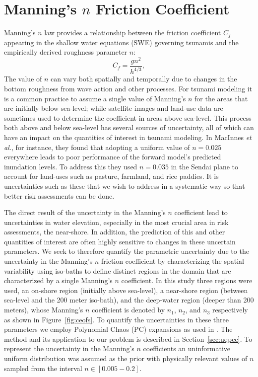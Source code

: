 \section{Manning’s $n$ Friction Coefficient} \label{sec:manning}

Manning's $n$ law provides a relationship between the friction coefficient
$C_f$ appearing in the shallow water equations (SWE) governing tsunamis and 
the empirically derived roughness parameter $n$:
\begin{equation}
    C_f = \frac{g n^2}{h^{4/3}},
\label{eq:coef}
\end{equation}
The value of $n$ can vary both spatially and temporally due to changes in the
bottom roughness from wave action and other processes.  For tsunami modeling it
is a common practice to assume a single value of Manning's $n$ for the areas
that are initially below sea-level; while satellite images and 
land-use data are sometimes used to determine the coefficient in areas above sea-level.  This
process both above and below sea-level has several sources of uncertainty, all
of which can have an impact on the quantities of interest in tsunami modeling.   
In MacInnes \emph{et al.}, for instance, they found that adopting a uniform value 
of $n = 0.025$ everywhere leads to poor performance of the forward model's predicted 
inundation levels.  To address this they used $n = 0.035$ in the Sendai plane to 
account for land-uses such as pasture, farmland, and rice paddies.  It is 
uncertainties such as these that we wish to address in a systematic way so that
better risk assessments can be done.

The direct result of the uncertainty in the Manning's $n$ coefficient lead to
uncertainties in water elevation,
especially in the most crucial area in risk assessments, the near-shore. In 
addition,  the prediction of this and other quantities of interest are often highly 
sensitive to changes in these uncertain parameters.  We seek to therefore 
quantify the parametric uncertainty due to the uncertainty in the Manning's $n$ 
friction coefficient by characterizing the spatial variability using
iso-baths to define distinct regions in the domain that are characterized by a
single Manning's $n$ coefficient.  In this study three regions were used, an
on-shore region (initially above sea-level), a near-shore region (between
sea-level and the 200 meter iso-bath), and the deep-water region (deeper than
200 meters), whose Manning's $n$ coefficient is denoted by $n_1$, $n_2$, and $n_3$ respectively 
as shown in Figure~\ref{fig:ceofs}. To quantify the uncertainties
in these three parameters we employ Polynomial Chaos (PC) 
expansions as used in \cite{sraj:2013a,sraj:2013b}.  The method and its 
application to our problem is
described in Section~\ref{sec:uqpce}.  To represent the uncertainty in the
Manning's $n$ coefficients an uninformative uniform distribution was assumed as 
the prior with physically relevant values of $n$ sampled from the interval 
$n \in [0.005-0.2]$.

